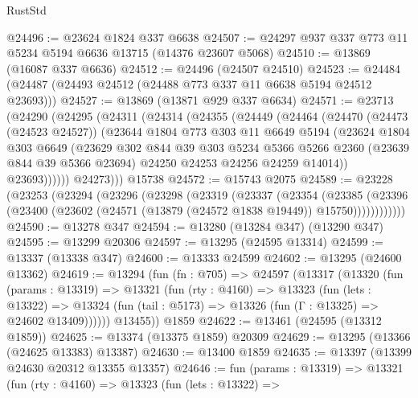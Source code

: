 \begin{lexlean}{RustStd}
\begin{coremodule}
@24496 := @23624 @1824 @337 @6638
@24507 := @24297 @937 @337 @773 @11 @5234 @5194 @6636 @13715 (@14376 @23607 @5068)
@24510 := @13869 (@16087 @337 @6636)
@24512 := @24496 (@24507 @24510)
@24523 := @24484 (@24487 (@24493 @24512 (@24488 @773 @337 @11 @6638 @5194 @24512 @23693)))
@24527 := @13869 (@13871 @929 @337 @6634)
@24571 := @23713
    (@24290
      (@24295
        (@24311
          (@24314
            (@24355
              (@24449
                (@24464
                  (@24470
                    (@24473 (@24523 @24527))
                    (@23644
                      @1804
                      @773
                      @303
                      @11
                      @6649
                      @5194
                      (@23624
                        @1804
                        @303
                        @6649
                        (@23629
                          @302
                          @844
                          @39
                          @303
                          @5234
                          @5366
                          @5266
                          @2360
                          (@23639 @844 @39 @5366 @23694)
                          @24250
                          @24253
                          @24256
                          @24259
                          @14014))
                      @23693))))))
          @24273)))
    @15738
@24572 := @15743 @2075
@24589 := @23228
    (@23253
      (@23294
        (@23296
          (@23298
            (@23319
              (@23337
                (@23354
                  (@23385
                    (@23396
                      (@23400 (@23602 (@24571 (@13879 (@24572 @1838 @19449)) @15750))))))))))))
@24590 := @13278 @347
@24594 := @13280 (@13284 @347) (@13290 @347)
@24595 := @13299 @20306
@24597 := @13295 (@24595 @13314)
@24599 := @13337 (@13338 @347)
@24600 := @13333 @24599
@24602 := @13295 (@24600 @13362)
@24619 := @13294
    (fun (fn : @705) =>
    @24597
      (@13317
        (@13320
          (fun (params : @13319) =>
          @13321
            (fun (rty : @4160) =>
            @13323
              (fun (lets : @13322) =>
              @13324 (fun (tail : @5173) => @13326 (fun (Γ : @13325) => @24602 @13409))))))
        @13455))
    @1859
@24622 := @13461 (@24595 (@13312 @1859))
@24625 := @13374 (@13375 @1859) @20309
@24629 := @13295 (@13366 (@24625 @13383) @13387)
@24630 := @13400 @1859
@24635 := @13397 (@13399 @24630 @20312 @13355 @13357)
@24646 := fun (params : @13319) =>
  @13321
    (fun (rty : @4160) =>
    @13323
      (fun (lets : @13322) =>

\end{coremodule}
\end{lexlean}
